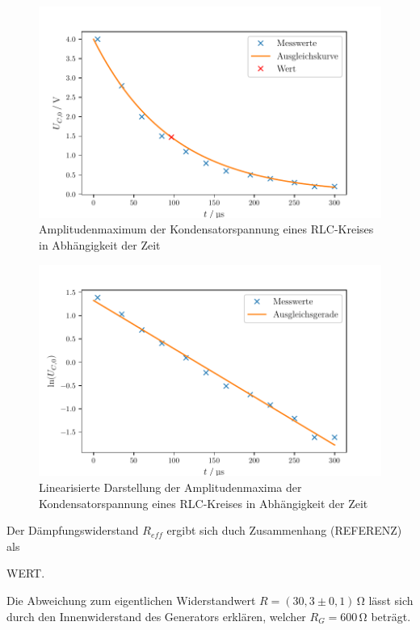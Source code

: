 \begin{figure}[H]
  \centering
  \includegraphics{build/plot1.pdf}
  \caption{Amplitudenmaximum der Kondensatorspannung eines RLC-Kreises in Abhängigkeit der Zeit}
  \label{fig:a}
\end{figure}

\begin{figure}[H]
  \centering
  \includegraphics{build/plot1-1.pdf}
  \caption{Linearisierte Darstellung der Amplitudenmaxima der Kondensatorspannung eines RLC-Kreises in Abhängigkeit der Zeit}
  \label{fig:b}
\end{figure}

\noindent Der Dämpfungswiderstand $R_{eff}$ ergibt sich duch
Zusammenhang (REFERENZ) als

WERT.

\noindent Die Abweichung zum eigentlichen Widerstandwert $R=(30,3 \pm 0,1)\,\si{\ohm}$
lässt sich durch den Innenwiderstand des Generators erklären,
welcher $R_G=600\,\si{\ohm}$ beträgt.





